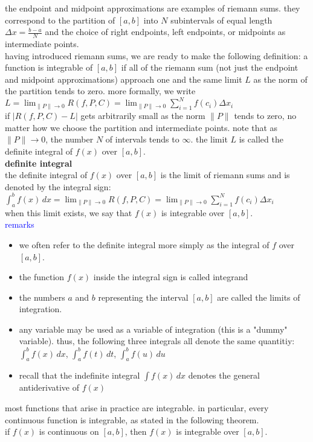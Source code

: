 \documentclass{article}
\begin{document}
the endpoint and midpoint approximations are examples of riemann sums. they correspond to the partition of $[a, b]$ into $N$ subintervals of equal length $\Delta x = \frac{b - a}{N}$ and the choice of right endpoints, left endpoints, or midpoints as intermediate points.\\

having introduced riemann sums, we are ready to make the following definition: a function is integrable of $[a, b]$ if all of the riemann sum (not just the endpoint and midpoint approximations) approach one and the same limit $L$ as the norm of the partition tends to zero. more formally, we write\\
$L = \lim_{\lVert P\rVert \to 0}R(f, P, C) = \lim_{\lVert P\rVert \to 0}\sum_{i=1}^{N}f(c_i)\Delta x_i$\\
if $\lvert R(f, P, C) - L\rvert$ gets arbitrarily small as the norm $\lVert P\rVert$ tends to zero, no matter how we choose the partition and intermediate points. note that as $\lVert P\rVert \to 0$, the number $N$ of intervals tends to $\infty$. the limit $L$ is called the definite integral of $f(x)$ over $[a, b]$.\\

\textbf{definite integral}\\
the definite integral of $f(x)$ over $[a, b]$ is the limit of riemann sums and is denoted by the integral sign:\\
$\int_{a}^{b}f(x)\, dx = \lim_{\lVert P\rVert \to 0}R(f, P, C) = \lim_{\lVert P\rVert \to 0}\sum_{i=1}^{N}f(c_i)\Delta x_i$\\
when this limit exists, we say that $f(x)$ is integrable over $[a, b]$.\\

\textcolor{blue}{remarks}
	\begin{itemize}
		\item we often refer to the definite integral more simply as the integral of $f$ over $[a, b]$.
		\item the function $f(x)$ inside the integral sign is called integrand
		\item the numbers $a$ and $b$ representing the interval $[a, b]$ are called the limits of integration.
		\item any variable may be used as a variable of integration (this is a "dummy" variable). thus, the following three integrals all denote the same quantitiy: $\int_{a}^{b}f(x)\,dx$, $\int_{a}^{b}f(t)\,dt$, $\int_{a}^{b}f(u)\,du$  
		\item recall that the indefinite integral $\int f(x)\, dx$ denotes the general antiderivative of $f(x)$
	\end{itemize}
most functions that arise in practice are integrable. in particular, every continuous function is integrable, as stated in the following theorem.\\
if $f(x)$ is continuous on $[a, b]$, then $f(x)$ is integrable over $[a, b]$.\\
\end{document}
